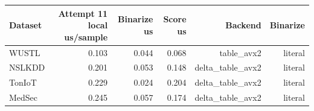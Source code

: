 \begin{tabular}{lrrrrr}
\toprule
Dataset & Attempt 11 local us/sample & Binarize us & Score us & Backend & Binarize \\
\midrule
WUSTL & 0.103 & 0.044 & 0.068 & table\_avx2 & literal \\
NSLKDD & 0.201 & 0.053 & 0.148 & delta\_table\_avx2 & literal \\
TonIoT & 0.229 & 0.024 & 0.204 & delta\_table\_avx2 & literal \\
MedSec & 0.245 & 0.057 & 0.174 & delta\_table\_avx2 & literal \\
\bottomrule
\end{tabular}
